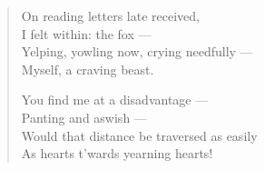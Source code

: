\begin{verse}
  On reading letters late received,\\
  I felt within: the fox ---\\
  Yelping, yowling now, crying needfully ---\\
  Myself, a craving beast.

  You find me at a disadvantage ---\\
  Panting and aswish ---\\
  Would that distance be traversed as easily\\
  As hearts t’wards yearning hearts!
\end{verse}
